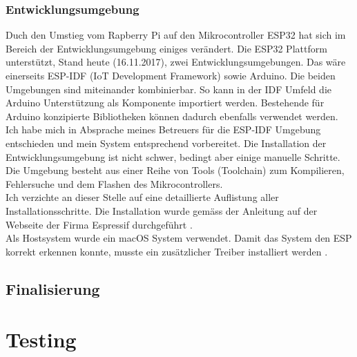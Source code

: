 \documentclass[11pt,english,german]{report}
\theoremstyle{definition}
\begin{document}
\subsection{Entwicklungsumgebung}
Duch den Umstieg vom Rapberry Pi auf den Mikrocontroller ESP32 hat sich im Bereich der Entwicklungsumgebung einiges verändert. Die ESP32 Plattform unterstützt, Stand heute (16.11.2017), zwei Entwicklungsumgebungen. Das wäre einerseits ESP-IDF (IoT Development Framework) sowie Arduino\cite{espidfarduino}. Die beiden Umgebungen sind miteinander kombinierbar. So kann in der IDF Umfeld die Arduino Unterstützung als Komponente importiert werden. Bestehende für Arduino konzipierte Bibliotheken können dadurch ebenfalls verwendet werden. Ich habe mich in Absprache meines Betreuers für die ESP-IDF Umgebung entschieden und mein System entsprechend vorbereitet. Die Installation der Entwicklungsumgebung ist nicht schwer, bedingt aber einige manuelle Schritte. Die Umgebung besteht aus einer Reihe von Tools (Toolchain) zum Kompilieren, Fehlersuche und dem Flashen des Mikrocontrollers.\\[0.3cm]
Ich verzichte an dieser Stelle auf eine detaillierte Auflistung aller Installationsschritte. Die Installation wurde gemäss der Anleitung auf der Webseite der Firma Espressif durchgeführt \cite{espidfinstallation}.\\[0.3cm]
Als Hostsystem wurde ein macOS System verwendet. Damit das System den ESP korrekt erkennen konnte, musste ein zusätzlicher Treiber installiert werden \cite{espidfdriver}. 

\newpage
\section{Finalisierung}

\chapter{Testing}
\end{document}
